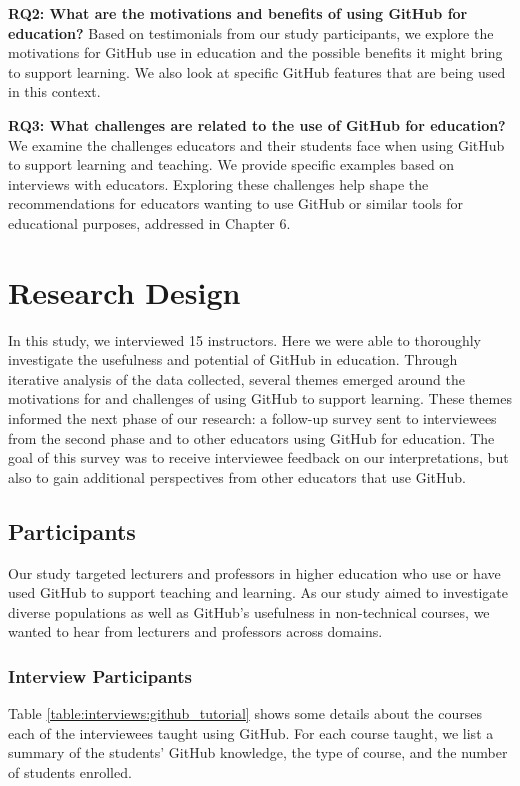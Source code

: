 \textbf{RQ2: What are the motivations and benefits of using GitHub for education?} Based on testimonials from our study participants, we explore the motivations for GitHub use in education and the possible benefits it might bring to support learning. We also look at specific GitHub features that are being used in this context.

\textbf{RQ3: What challenges are related to the use of GitHub for education?} We examine the challenges educators and their students face when using GitHub to support learning and teaching. We provide specific examples based on interviews with educators. Exploring these challenges help shape the recommendations for educators wanting to use GitHub or similar tools for educational purposes, addressed in Chapter 6.

\section{Research Design}
In this study, we interviewed 15 instructors. Here we were able to thoroughly investigate the usefulness and potential of GitHub in education. Through iterative analysis of the data collected, several themes emerged around the motivations for and challenges of using GitHub to support learning. These themes informed the next phase of our research: a follow-up survey sent to interviewees from the second phase and to other educators using GitHub for education. The goal of this survey was to receive interviewee feedback on our interpretations, but also to gain additional perspectives from other educators that use GitHub.

\subsection{Participants}
Our study targeted lecturers and professors in higher education who use or have used GitHub to support teaching and learning. As our study aimed to investigate diverse populations as well as GitHub's usefulness in non-technical courses, we wanted to hear from lecturers and professors across domains.

\subsubsection{Interview Participants}
Table \ref{table:interviews:github_tutorial} shows some details about the courses each of the interviewees taught using GitHub. For each course taught, we list a summary of the students' GitHub knowledge, the type of course, and the number of students enrolled.

